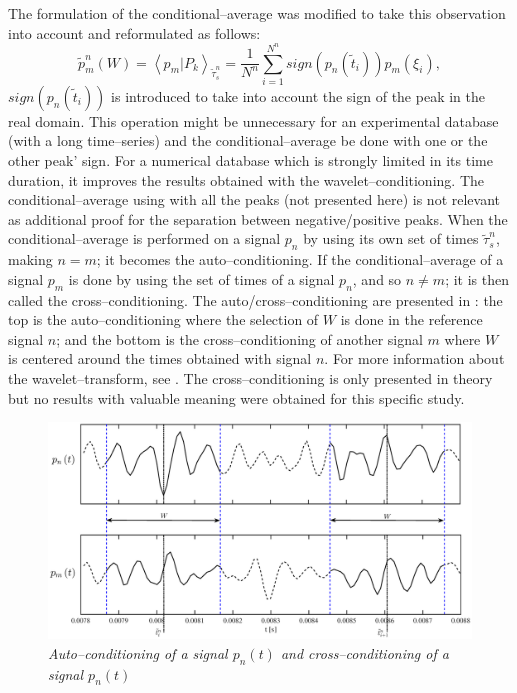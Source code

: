 The formulation of the conditional--average was modified to take this observation into account and reformulated as follows:
\begin{equation} \label{eqn:condAvgSign}
\tilde{p}_{m}^n\left( W \right) = \left< p_{m} | P_{k} \right>_{\tilde{\tau}^n_{s}} = \frac{1}{N^n} \sum^{N^n}_{i = 1} sign\left( p_{n} \left( \tilde{t}_{i} \right) \right) p_{m} \left( \xi_{i} \right),
\end{equation}
$sign\left( p_{n} \left( \tilde{t}_{i} \right) \right)$ is introduced to take into account the sign of the peak in the real domain. This operation might be unnecessary for an experimental database (with a long time--series) and the conditional--average be done with one or the other peak' sign. For a numerical database which is strongly limited in its time duration, it improves the results obtained with the wavelet--conditioning.
The conditional--average using  with all the peaks (not presented here) is not relevant as additional proof for the separation between negative/positive peaks.
When the conditional--average is performed on a signal $p_{n}$ by using its own set of times ${\tilde{\tau}^n_{s}}$, making $n = m$; it becomes the auto--conditioning. If the conditional--average of a signal $p_{m}$ is done by using the set of times of a signal $p_{n}$, and so $n \neq m$; it is then called the cross--conditioning. The auto/cross--conditioning are presented in : the top is the auto--conditioning where the selection of $W$ is done in the reference signal $n$; and the bottom is the cross--conditioning of another signal $m$ where $W$ is centered around the times obtained with signal $n$. For more information about the wavelet--transform, see \cite{Farge1992}. The cross--conditioning is only presented in theory but no results with valuable meaning were obtained for this specific study.
\begin{figure}
	\centering
	\includegraphics[width=1\textwidth]{Figures/condNcond.eps}
	\caption{\textit{Auto--conditioning of a signal $p_n(t)$ and cross--conditioning of a signal $p_n(t)$}}
	\label{fig:condNcond}
\end{figure}

